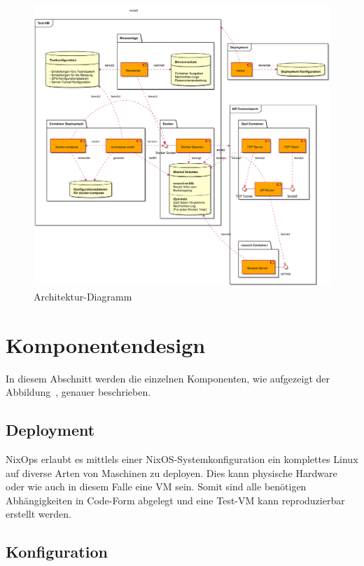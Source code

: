 \begin{figure}[htp]
  \includegraphics[width=1.1\textwidth]{include/uml/componentDiagram.png}
  \caption{Architektur-Diagramm}\label{fig:architektur-diagramm}
\end{figure}


\section{Komponentendesign}\label{sec:komponentendesign}

In diesem Abschnitt werden die einzelnen Komponenten, wie aufgezeigt der Abbildung~, genauer beschrieben.

\subsection{Deployment}

NixOps erlaubt es mittlels einer NixOS-Systemkonfiguration ein komplettes Linux auf diverse Arten von Maschinen zu deployen. Dies kann physische Hardware oder wie auch in diesem Falle eine VM sein.
Somit sind alle benötigen Abhängigkeiten in Code-Form abgelegt und eine Test-VM kann reproduzierbar erstellt werden.

\subsection{Konfiguration}

